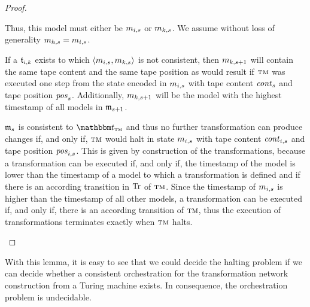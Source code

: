 \begin{proof}
\begin{longenumerate}
            Thus, this model must either be $\model{m}{i,s}$ or $\model{m}{k,s}$.
            We assume without loss of generality $\model{m}{h,s} = \model{m}{i,s}$.            
		 \item
            If a $\transformation{t}_{i,k}$ exists to which $\tupled{\model{m}{i,s},\model{m}{k,s}}$ is not consistent, then $\model{m}{k,s+1}$ %
            will contain the same tape content and the same tape position as would result if $\textsc{tm}$ was executed one step from the state encoded in $\model{m}{i,s}$ with tape content $\mathit{cont}_s$ and tape position $\mathit{pos}_s$.
		 	Additionally, $\model{m}{k,s+1}$ will be the model with the highest timestamp of all models in $\modeltuple{m}_{s+1}$.
		 \item 
             $\modeltuple{m}_{s}$ is consistent to $\transformationset{T}_{\TuringMachine}$ and thus no further transformation can produce changes if, and only if, $\textsc{tm}$ would halt in state $\model{m}{i,s}$ with tape content $\mathit{cont}_{i,s}$ and tape position $\mathit{pos}_{i,s}$.
             This is given by construction of the transformations, because a transformation can be executed if, and only if, the timestamp of the model is lower than the timestamp of a model to which a transformation is defined and if there is an according transition in $\operatorname{Tr}$ of $\textsc{tm}$.
             Since the timestamp of $\model{m}{i,s}$ is higher than the timestamp of all other models, a transformation can be executed if, and only if, there is an according transition of $\textsc{tm}$, thus the execution of transformations terminates exactly when $\textsc{tm}$ halts.
		 	\qedhere
	\end{longenumerate}
\end{proof}

With this lemma, it is easy to see that we could decide the halting problem if we can decide whether a consistent orchestration for the transformation network construction from a Turing machine exists.
In consequence, the orchestration problem is undecidable.

